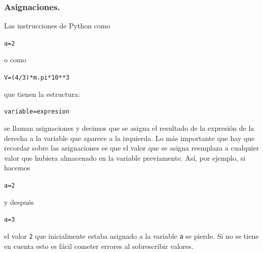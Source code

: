 \documentclass[10pt,a4paper]{article}\usepackage[]{graphicx}\usepackage[]{color}
\makeatletter
\newcommand{\hlnum}[1]{\textcolor[rgb]{0.686,0.059,0.569}{#1}}%
\newcommand{\hlopt}[1]{\textcolor[rgb]{0,0,0}{#1}}%
\newcommand{\hlstd}[1]{\textcolor[rgb]{0.345,0.345,0.345}{#1}}%
\newcommand{\hlkwb}[1]{\textcolor[rgb]{0.69,0.353,0.396}{#1}}%
\newenvironment{kframe}{%
 \def\at@end@of@kframe{}%
 \ifinner\ifhmode%
  \def\at@end@of@kframe{\end{minipage}}%
  \begin{minipage}{\columnwidth}%
 \fi\fi%
 \def\FrameCommand##1{\hskip\@totalleftmargin \hskip-\fboxsep
 \colorbox{shadecolor}{##1}\hskip-\fboxsep
     \hskip-\linewidth \hskip-\@totalleftmargin \hskip\columnwidth}%
 \MakeFramed {\advance\hsize-\width
   \@totalleftmargin\z@ \linewidth\hsize
   \@setminipage}}%
 {\par\unskip\endMakeFramed%
 \at@end@of@kframe}
\newenvironment{knitrout}{}{} %
\makeatother
\begin{document}
\subsubsection*{Asignaciones.}
\label{tut02:subsubsec:asignaciones}

Las instrucciones de Python como
\begin{knitrout}
\color{fgcolor}\begin{kframe}
\begin{alltt}
\hlstd{a} \hlkwb{=} \hlnum{2}
\end{alltt}
\end{kframe}
\end{knitrout}
o como
\begin{knitrout}
\color{fgcolor}\begin{kframe}
\begin{alltt}
\hlstd{V} \hlkwb{=} \hlstd{(}\hlnum{4} \hlopt{/} \hlnum{3}\hlstd{)} \hlopt{*} \hlstd{m.pi} \hlopt{*} \hlnum{10}\hlopt{**}\hlnum{3}
\end{alltt}
\end{kframe}
\end{knitrout}
que tienen la estructura:
\begin{knitrout}
\color{fgcolor}\begin{kframe}
\begin{alltt}
\hlstd{variable} \hlkwb{=} \hlstd{expresion}
\end{alltt}
\end{kframe}
\end{knitrout}
se llaman {\sf asignaciones} y decimos que se asigna el resultado de la expresión de la derecha a la variable que aparece a la izquierda. Lo más importante que hay que recordar sobre las asignaciones es que el valor que se asigna reemplaza a cualquier valor que hubiera almacenado en la variable previamente. Así, por ejemplo, si hacemos
\begin{knitrout}
\color{fgcolor}\begin{kframe}
\begin{alltt}
\hlstd{a} \hlkwb{=} \hlnum{2}
\end{alltt}
\end{kframe}
\end{knitrout}
y después
\begin{knitrout}
\color{fgcolor}\begin{kframe}
\begin{alltt}
\hlstd{a} \hlkwb{=} \hlnum{3}
\end{alltt}
\end{kframe}
\end{knitrout}
el valor {\tt 2} que inicialmente estaba asignado a la variable {\tt a} se pierde. Si no se tiene en cuenta esto es fácil cometer errores al sobrescribir valores.
\end{document}
